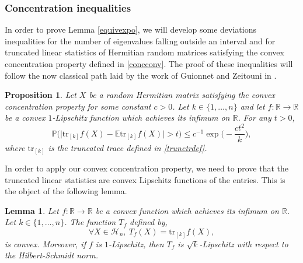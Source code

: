 \documentclass[aop,preprint]{imsart}
\newcommand\RR{\mathbb{R}}
\newcommand\PP{\mathbb{P}}
\newcommand\EE{\mathbb{E}}
\newcommand\tr{\mathrm{tr}}
\numberwithin{equation}{section}
\theoremstyle{definition}
\theoremstyle{plain}
\newtheorem{Pro}[Def]{Proposition}
\newtheorem{Lem}[Def]{Lemma}
\theoremstyle{remark}
\begin{document}
\subsubsection{Concentration inequalities}\label{conc}
In order to prove Lemma \ref{equivexpo}, we will develop some deviations inequalities for the number of eigenvalues falling outside an interval and for truncated linear statistics of Hermitian random matrices satisfying the convex concentration property defined in \ref{concconv}. The proof of these inequalities will follow the now classical path laid by the work of Guionnet and Zeitouni in \cite{GZconc}.

\begin{Pro}\label{conckconv}  Let $X$ be a random Hermitian matrix satisfying the convex concentration property for some constant $c>0$. Let $k \in \{1,\ldots,n\}$ and let $f : \RR \to \RR$ be a convex $1$-Lipschitz function which achieves its infimum on $\RR$. For any $t>0$,
$$\PP \Big( \big| \tr_{[k]} f(X) - \EE \tr_{[k]} f(X)\big| > t \Big) \leq c^{-1}\exp\Big( -\frac{ ct^{2}}{k}\Big),$$
where $\tr_{[k]}$ is the truncated trace defined in \eqref{trunctrdef}.
\end{Pro}
In order to apply our convex concentration property, we need to prove that the truncated linear statistics are convex Lipschitz functions of the entries. This is the object of the following lemma.

\begin{Lem}\label{convex}
Let $f : \RR \to \RR$ be a convex function which achieves its infimum on $\RR$. Let $k\in \{1,\ldots,n\}$. The function $T_f$ defined by,
$$\forall X \in \mathcal{H}_n, \ T_f(X) = \tr_{[k]} f(X),$$
 is  convex. Moreover, if $f$ is $1$-Lipschitz, then $T_f$ is $\sqrt{k}$-Lipschitz with respect to the Hilbert-Schmidt norm.
\end{Lem}
\end{document}
